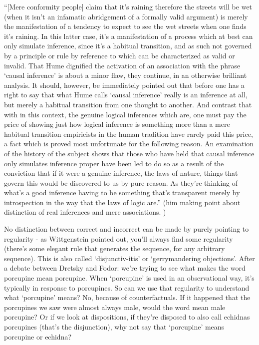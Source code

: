 ``[Mere conformity people] claim that it's raining therefore the streets will be wet (when it isn't an infamatic abridgement of a formally valid argument) is merely the manifestation of a tendency to expect to see the wet streets when one finds it's raining. In this latter case, it's a manifestation of a process which at best can only simulate inference, since it's a habitual transition, and as such not governed by a principle or rule by reference to which can be characterized as valid or invalid. That Hume dignified the activation of an association with the phrase `causal inference' is about a minor flaw, they continue, in an otherwise brilliant analysis. It should, however, be immediately pointed out that before one has a right to say that what Hume calls `causal inference' really is an inference at all, but merely a habitual transition from one thought to another. And contrast that with in this context, the genuine logical inferences which are, one must pay the price of showing just how logical inference is something more than a mere habitual transition empiricists in the human tradition have rarely paid this price, a fact which is proved most unfortunate for the following reason. An examination of the history of the subject shows that those who have held that causal inference only simulates inference proper have been led to do so as a result of the conviction that if it were a genuine inference, the laws of nature, things that govern this would be discovered to us by pure reason.  As they're thinking of what's a good inference having to be something that's transparent merely by introspection in the way that the laws of logic are.'' (him making point about distinction of real inferences and mere associations. )

No distinction between correct and incorrect can be made by purely pointing to regularity - as Wittgenstein pointed out, you'll always find some regularity (there's some elegant rule that generates the sequence, for any arbitrary sequence). This is also called `disjunctiv-itis' or `gerrymandering objections'. After a debate between Dretsky and Fodor: we're trying to see what makes the word porcupine mean porcupine. When `porcupine' is used in an observational way, it's typically in response to porcupines. So can we use that regularity to understand what `porcupine' means? No, because of counterfactuals. If it happened that the porcupines we saw were almost always male, would the word mean male porcupine? Or if we look at dispositions, if they're disposed to also call echidnas porcupines (that's the disjunction), why not say that `porcupine' means porcupine or echidna?

